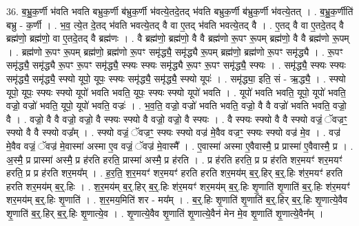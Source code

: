 \documentclass[17pt]{extarticle}
\begin{document}
36. ब॒भ्रु॒क॒र्णी भ॑वति भवति बभ्रुक॒र्णी ब॑भ्रुक॒र्णी भ॑वत्ये॒तदे॒तद् भ॑वति बभ्रुक॒र्णी ब॑भ्रुक॒र्णी भ॑वत्ये॒तत् । . ब॒भ्रु॒क॒र्णीति॑ बभ्रु - क॒र्णी । . भ॒व॒ त्ये॒त दे॒तद् भ॑वति भवत्ये॒तद् वै वा ए॒तद् भ॑वति भवत्ये॒तद् वै । . ए॒तद् वै वा ए॒तदे॒तद् वै ब्रह्म॑णो॒ ब्रह्म॑णो॒ वा ए॒तदे॒तद् वै ब्रह्म॑णः । . वै ब्रह्म॑णो॒ ब्रह्म॑णो॒ वै वै ब्रह्म॑णो रू॒पꣳ रू॒पम् ब्रह्म॑णो॒ वै वै ब्रह्म॑णो रू॒पम् । . ब्रह्म॑णो रू॒पꣳ रू॒पम् ब्रह्म॑णो॒ ब्रह्म॑णो रू॒पꣳ समृ॑द्ध्यै॒ समृ॑द्ध्यै रू॒पम् ब्रह्म॑णो॒ ब्रह्म॑णो रू॒पꣳ समृ॑द्ध्यै । . रू॒पꣳ समृ॑द्ध्यै॒ समृ॑द्ध्यै रू॒पꣳ रू॒पꣳ समृ॑द्ध्यै॒ स्फ्यः स्फ्यः समृ॑द्ध्यै रू॒पꣳ रू॒पꣳ समृ॑द्ध्यै॒ स्फ्यः । . समृ॑द्ध्यै॒ स्फ्यः स्फ्यः समृ॑द्ध्यै॒ समृ॑द्ध्यै॒ स्फ्यो यूपो॒ यूपः॒ स्फ्यः समृ॑द्ध्यै॒ समृ॑द्ध्यै॒ स्फ्यो यूपः॑ । . समृ॑द्ध्या॒ इति॒ सं - ऋ॒द्ध्यै॒ । . स्फ्यो यूपो॒ यूपः॒ स्फ्यः स्फ्यो यूपो॑ भवति भवति॒ यूपः॒ स्फ्यः स्फ्यो यूपो॑ भवति । . यूपो॑ भवति भवति॒ यूपो॒ यूपो॑ भवति॒ वज्रो॒ वज्रो॑ भवति॒ यूपो॒ यूपो॑ भवति॒ वज्रः॑ । . भ॒व॒ति॒ वज्रो॒ वज्रो॑ भवति भवति॒ वज्रो॒ वै वै वज्रो॑ भवति भवति॒ वज्रो॒ वै । . वज्रो॒ वै वै वज्रो॒ वज्रो॒ वै स्फ्यः स्फ्यो वै वज्रो॒ वज्रो॒ वै स्फ्यः । . वै स्फ्यः स्फ्यो वै वै स्फ्यो वज्रं॒ ॅवज्रꣳ॒॒ स्फ्यो वै वै स्फ्यो वज्र᳚म् । . स्फ्यो वज्रं॒ ॅवज्रꣳ॒॒ स्फ्यः स्फ्यो वज्र॑ मे॒वैव वज्रꣳ॒॒ स्फ्यः स्फ्यो वज्र॑ मे॒व । . वज्र॑ मे॒वैव वज्रं॒ ॅवज्र॑ मे॒वास्मा॑ अस्मा ए॒व वज्रं॒ ॅवज्र॑ मे॒वास्मै᳚ । . ए॒वास्मा॑ अस्मा ए॒वैवास्मै॒ प्र प्रास्मा॑ ए॒वैवास्मै॒ प्र । . अ॒स्मै॒ प्र प्रास्मा॑ अस्मै॒ प्र ह॑रति हरति॒ प्रास्मा॑ अस्मै॒ प्र ह॑रति । . प्र ह॑रति हरति॒ प्र प्र ह॑रति शर॒मयꣳ॑ शर॒मयꣳ॑ हरति॒ प्र प्र ह॑रति शर॒मय᳚म् । . ह॒र॒ति॒ श॒र॒मयꣳ॑ शर॒मयꣳ॑ हरति हरति शर॒मय॑म् ब॒र्॒.हिर् ब॒र्॒.हिः श॑र॒मयꣳ॑ हरति हरति शर॒मय॑म् ब॒र्॒.हिः । . श॒र॒मय॑म् ब॒र्॒.हिर् ब॒र्॒.हिः श॑र॒मयꣳ॑ शर॒मय॑म् ब॒र्॒.हिः शृ॒णाति॑ शृ॒णाति॑ ब॒र्॒.हिः श॑र॒मयꣳ॑ शर॒मय॑म् ब॒र्॒.हिः शृ॒णाति॑ । . श॒र॒मय॒मिति॑ शर - मय᳚म् । . ब॒र्॒.हिः शृ॒णाति॑ शृ॒णाति॑ ब॒र्॒.हिर् ब॒र्॒.हिः शृ॒णात्ये॒वैव शृ॒णाति॑ ब॒र्॒.हिर् ब॒र्॒.हिः शृ॒णात्ये॒व । . शृ॒णात्ये॒वैव शृ॒णाति॑ शृ॒णात्ये॒वैन॑ मेन मे॒व शृ॒णाति॑ शृ॒णात्ये॒वैन᳚म् । \newline
\pagebreak
{}
\end{document}

